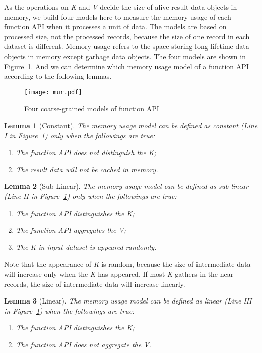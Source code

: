As the operations on \textit{K} and \textit{V} decide the size of alive result data objects in memory, we build four models here to measure the memory usage of each function API when it processes a unit of data. The models are based on processed size, not the processed records, because the size of one record in each dataset is different. Memory usage refers to the space storing long lifetime data objects in memory except garbage data objects. The four models are shown in Figure~\ref{fig:mur}. And we can determine which memory usage model of a function API according to the following lemmas.

\begin{figure}[!t]
\centering
\texttt{[image: mur.pdf]}
\caption{Four coarse-grained models of function API}
\label{fig:mur}
\end{figure}

\newtheorem{lemma}{Lemma}
\begin{lemma}[Constant] The memory usage model can be defined as constant (Line I in Figure~\ref{fig:mur}) only when the followings are true:
\begin{enumerate}
\item The function API does not distinguish the \textit{K};
\item The result data will not be cached in memory.
\end{enumerate}
\end{lemma}

\begin{lemma}[Sub-Linear] The memory usage model can be defined as sub-linear (Line II in Figure~\ref{fig:mur}) only when the followings are true:
\begin{enumerate}
\item The function API distinguishes the \textit{K};
\item The function API aggregates the \textit{V};
\item The \textit{K} in input dataset is appeared randomly.
\end{enumerate}
\end{lemma}

Note that the appearance of \textit{K} is random, because the size of intermediate data will increase only when the \textit{K} has appeared. If most \textit{K} gathers in the near records, the size of intermediate data will increase linearly.

\begin{lemma}[Linear] The memory usage model can be defined as linear (Line III in Figure~\ref{fig:mur}) when the followings are true:
\begin{enumerate}
\item The function API distinguishes the \textit{K};
\item The function API does not aggregate the \textit{V}.
\end{enumerate}
\end{lemma}

